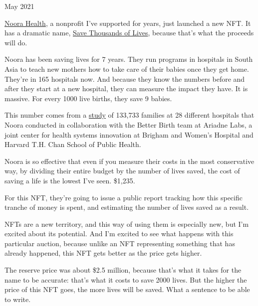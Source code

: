 May 2021

\href{https://www.noorahealth.org/}{Noora Health}, a nonprofit I've
supported for years, just launched a new NFT. It has a dramatic name,
\href{http://bit.ly/NooraNFT}{Save Thousands of Lives}, because that's
what the proceeds will do.

Noora has been saving lives for 7 years. They run programs in hospitals
in South Asia to teach new mothers how to take care of their babies once
they get home. They're in 165 hospitals now. And because they know the
numbers before and after they start at a new hospital, they can measure
the impact they have. It is massive. For every 1000 live births, they
save 9 babies.

This number comes from a \href{http://bit.ly/NFT-research}{study} of
133,733 families at 28 different hospitals that Noora conducted in
collaboration with the Better Birth team at Ariadne Labs, a joint center
for health systems innovation at Brigham and Women's Hospital and
Harvard T.H. Chan School of Public Health.

Noora is so effective that even if you measure their costs in the most
conservative way, by dividing their entire budget by the number of lives
saved, the cost of saving a life is the lowest I've seen. \$1,235.

For this NFT, they're going to issue a public report tracking how this
specific tranche of money is spent, and estimating the number of lives
saved as a result.

NFTs are a new territory, and this way of using them is especially new,
but I'm excited about its potential. And I'm excited to see what happens
with this particular auction, because unlike an NFT representing
something that has already happened, this NFT gets better as the price
gets higher.

The reserve price was about \$2.5 million, because that's what it takes
for the name to be accurate: that's what it costs to save 2000 lives.
But the higher the price of this NFT goes, the more lives will be saved.
What a sentence to be able to write.
